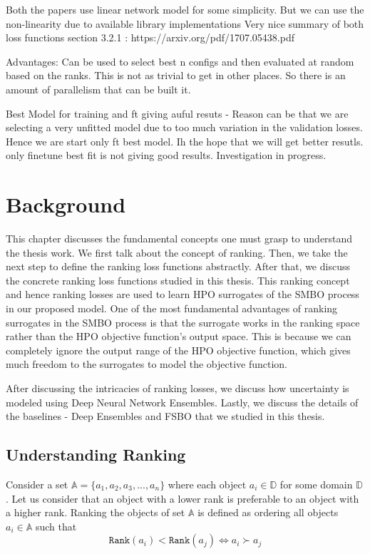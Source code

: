\documentclass[12pt, twoside, ngerman]{report}
\begin{document}
    Both the papers use linear network model for some simplicity. But we can use the non-linearity due to available library
        implementations
    Very nice summary of both loss functions section 3.2.1 : https://arxiv.org/pdf/1707.05438.pdf 

Advantages:
    Can be used to select best n configs and then evaluated at random based on the ranks. This is not as trivial to get in other
    places. So there is an amount of parallelism that can be built it.

Best Model for training and ft giving auful resuts - Reason can be that we are selecting a very unfitted model due to too much variation in the validation losses.
Hence we are start only ft best model. Ih the hope that we will get better resutls.
only finetune best fit is not giving good results. Investigation in progress. 

\fi


\chapter{Background}
\label{chap:Background}

This chapter discusses the fundamental concepts one must grasp to understand the thesis work. 
We first talk about the concept of ranking.
Then, we take the next step to define the ranking loss functions abstractly.
After that, we discuss the concrete ranking loss functions studied in this thesis.
This ranking concept and hence ranking losses are used to learn HPO surrogates of the SMBO process in our proposed model.
One of the most fundamental advantages of ranking surrogates in the SMBO process is that the surrogate works in the ranking space rather than the HPO objective function's output space. This is because we can completely ignore the output range of the HPO objective function, which gives much freedom to the surrogates to model the objective function.

After discussing the intricacies of ranking losses, we discuss how uncertainty is modeled using Deep Neural Network Ensembles.
Lastly,  we discuss the details of the baselines - Deep Ensembles and FSBO that we studied in this thesis.

\section{Understanding Ranking}

Consider a set $\mathbb{A} = \{a_1,  a_2,  a_3, ... ,  a_n\}$ where each object $a_i \in \mathbb{D}$ for some domain $\mathbb{D}$.
Let us consider that an object with a lower rank is preferable to an object with a higher rank.
Ranking the objects of set $\mathbb{A}$ is defined as ordering all objects $a_i \in \mathbb{A}$ such that
$$
\texttt{Rank}(a_i) < \texttt{Rank}(a_j) \iff a_i  \succ a_j
$$
\end{document}
